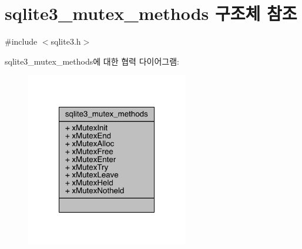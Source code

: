 \hypertarget{structsqlite3__mutex__methods}{}\section{sqlite3\+\_\+mutex\+\_\+methods 구조체 참조}
\label{structsqlite3__mutex__methods}


{\ttfamily \#include $<$sqlite3.\+h$>$}



sqlite3\+\_\+mutex\+\_\+methods에 대한 협력 다이어그램\+:
\nopagebreak
\begin{figure}[H]
\begin{center}
\leavevmode
\includegraphics[width=200pt]{structsqlite3__mutex__methods__coll__graph}
\end{center}
\end{figure}
